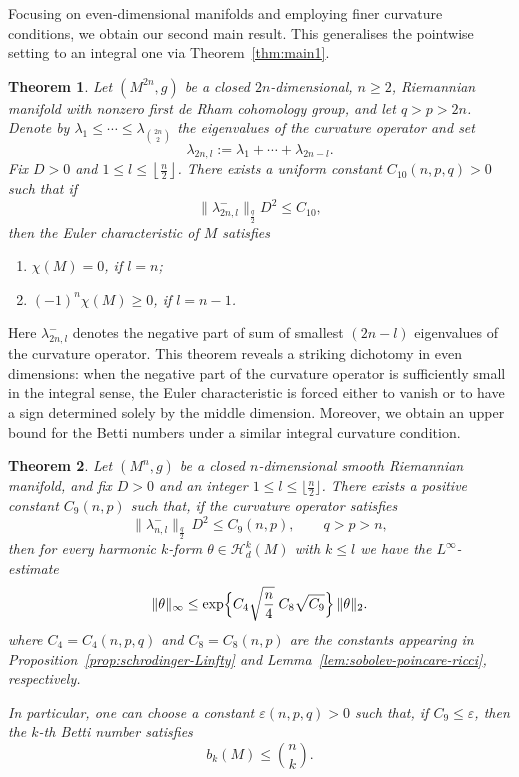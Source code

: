 \documentclass[12pt, twoside]{article}
\newtheorem{theorem}{Theorem}[section]
\theoremstyle{definition}
\numberwithin{equation}{section}
\begin{document}
Focusing on even-dimensional manifolds and employing finer curvature conditions, we obtain our second main result. This generalises the pointwise setting to an integral one via Theorem~\ref{thm:main1}.
\begin{theorem}
	\label{thm:main2}
	Let $(M^{2n},g)$ be a closed $2n$-dimensional, $n\geq2$, Riemannian manifold with nonzero first de Rham cohomology group, and let $q>p>2n$. Denote by $\lambda_{1}\leq\cdots\leq\lambda_{\binom{2n}{2}}$ the eigenvalues of the curvature operator and
	 set $$\lambda_{2n,l}:=\lambda_{1}+\cdots+\lambda_{2n-l}.$$ 
 Fix $D>0$ and $1\leq l\leq\left\lfloor\frac{n}{2}\right\rfloor$.  There exists a uniform constant $C_{10}(n,p,q)>0$ such that if 
	$$\|\lambda_{2n,l}^{-}\|_{\frac{q}{2}}D^{2}\leq C_{10},$$ 
	then the Euler characteristic of $M$ satisfies
	\begin{enumerate}
		\item $\chi(M)=0$, if $l=n$;
		\item $(-1)^{n}\chi(M)\geq 0$, if $l=n-1$.
	\end{enumerate}
\end{theorem}
Here $\lambda_{2n,l}^{-}$ denotes the negative part of sum of smallest $(2n-l)$ eigenvalues of the curvature operator. This theorem reveals a striking dichotomy in even dimensions: when the negative part of the curvature operator is sufficiently small in the integral sense, the Euler characteristic is forced either to vanish or to have a sign determined solely by the middle dimension. Moreover, we obtain an upper bound for the Betti numbers under a similar integral curvature condition.
\begin{theorem}\label{thm:harmonic-Linfty}
	Let \((M^{n},g)\) be a closed \(n\)-dimensional smooth Riemannian manifold, and fix \(D>0\) and an integer \(1\le l\le\bigl\lfloor\frac{n}{2}\bigr\rfloor\). 
	There exists a positive constant \(C_{9}(n,p)\) such that, if the curvature operator satisfies
	\[
	\bigl\|\lambda^{-}_{n,l}\bigr\|_{\frac{q}{2}}\,D^{2}\le C_{9}(n,p),\qquad q>p>n,
	\]
	then for every harmonic \(k\)-form \(\theta\in\mathcal{H}_{d}^{k}(M)\) with \(k\le l\) we have the \(L^{\infty}\)-estimate
	\[
	\|\theta\|_{\infty}
	\le \exp\Bigl\{ C_{4}\sqrt{\frac{n}{4}}\;C_{8}\sqrt{C_{9}} \Bigr\} \,\|\theta\|_{2}.
	\]
	where \(C_{4}=C_{4}(n,p,q)\) and \(C_{8}=C_{8}(n,p)\) are the constants appearing in Proposition~\ref{prop:schrodinger-Linfty} and Lemma~\ref{lem:sobolev-poincare-ricci}, respectively.
	
	In particular, one can choose a constant \(\varepsilon(n,p,q)>0\) such that, if \(C_{9}\le\varepsilon\), then the \(k\)-th Betti number satisfies
	\[
	b_{k}(M)\le\binom{n}{k}.
	\]
\end{theorem}
\end{document}
